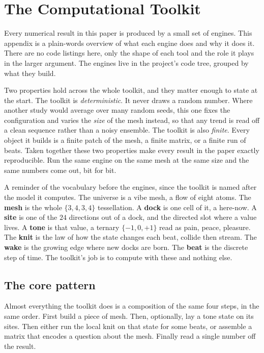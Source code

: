 \section{The Computational Toolkit}

Every numerical result in this paper is produced by a small set of engines. This appendix is a plain-words overview of what each engine does and why it does it. There are no code listings here, only the shape of each tool and the role it plays in the larger argument. The engines live in the project's code tree, grouped by what they build.

Two properties hold across the whole toolkit, and they matter enough to state at the start. The toolkit is \emph{deterministic}. It never draws a random number. Where another study would average over many random seeds, this one fixes the configuration and varies the \emph{size} of the mesh instead, so that any trend is read off a clean sequence rather than a noisy ensemble. The toolkit is also \emph{finite}. Every object it builds is a finite patch of the mesh, a finite matrix, or a finite run of beats. Taken together these two properties make every result in the paper exactly reproducible. Run the same engine on the same mesh at the same size and the same numbers come out, bit for bit.

A reminder of the vocabulary before the engines, since the toolkit is named after the model it computes. The universe is a vibe mesh, a flow of eight atoms. The \textbf{mesh} is the whole $\{3,4,3,4\}$ tessellation. A \textbf{dock} is one cell of it, a here-now. A \textbf{site} is one of the $24$ directions out of a dock, and the directed slot where a value lives. A \textbf{tone} is that value, a ternary $\{-1, 0, +1\}$ read as pain, peace, pleasure. The \textbf{knit} is the law of how the state changes each beat, collide then stream. The \textbf{wake} is the growing edge where new docks are born. The \textbf{beat} is the discrete step of time. The toolkit's job is to compute with these and nothing else.

\subsection{The core pattern}

Almost everything the toolkit does is a composition of the same four steps, in the same order. First build a piece of mesh. Then, optionally, lay a tone state on its sites. Then either run the local knit on that state for some beats, or assemble a matrix that encodes a question about the mesh. Finally read a single number off the result.

